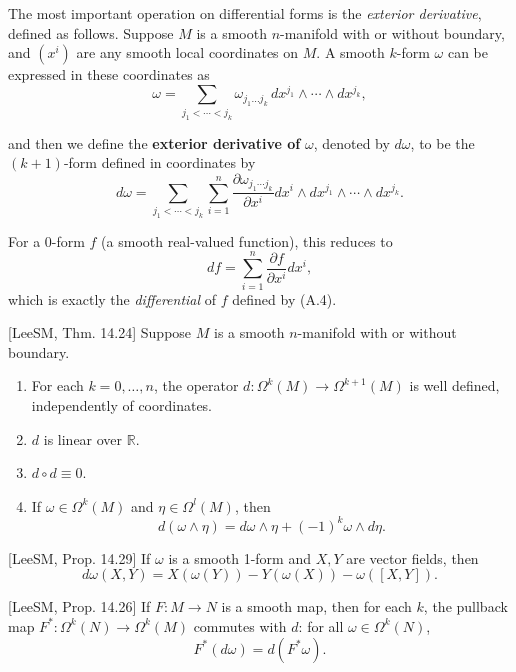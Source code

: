 The most important operation on differential forms is the \emph{exterior derivative}, defined as follows. Suppose $M$ is a smooth $n$-manifold with or without boundary, and $(x^i)$ are any smooth local coordinates on $M$. A smooth $k$-form $\omega$ can be expressed in these coordinates as
\[
\omega = \sum_{j_1 < \cdots < j_k} \omega_{j_1\ldots j_k} \, dx^{j_1} \wedge \cdots \wedge dx^{j_k},
\]

and then we define the \textbf{exterior derivative of} $\omega$, denoted by $d\omega$, to be the $(k+1)$-form defined in coordinates by
\[
d\omega = \sum_{j_1 < \cdots < j_k} \sum_{i=1}^n \frac{\partial \omega_{j_1 \cdots j_k}}{\partial x^i} dx^i \wedge dx^{j_1} \wedge \cdots \wedge dx^{j_k}.
\]

For a 0-form $f$ (a smooth real-valued function), this reduces to
\[
df = \sum_{i=1}^n \frac{\partial f}{\partial x^i} dx^i,
\]
which is exactly the \emph{differential} of $f$ defined by (A.4).

\begin{proposition}
\label{prop:exterior-differentiation-properties}
[LeeSM, Thm. 14.24] Suppose $M$ is a smooth $n$-manifold with or without boundary.
\begin{enumerate}
\item[(a)] For each $k = 0, \ldots, n$, the operator $d: \Omega^k(M) \to \Omega^{k+1}(M)$ is well defined, independently of coordinates.
\item[(b)] $d$ is linear over $\mathbb{R}$.
\item[(c)] $d \circ d \equiv 0$.
\item[(d)] If $\omega \in \Omega^k(M)$ and $\eta \in \Omega^l(M)$, then
\[
d(\omega \wedge \eta) = d\omega \wedge \eta + (-1)^k \omega \wedge d\eta.
\]
\end{enumerate}
\end{proposition}

\begin{proposition}
\label{prop:exterior-derivative-one-form}
[LeeSM, Prop. 14.29] If $\omega$ is a smooth 1-form and $X, Y$ are vector fields, then
\[
d\omega(X,Y) = X(\omega(Y)) - Y(\omega(X)) - \omega([X,Y]).
\]
\end{proposition}

\begin{proposition}
\label{prop:exterior-derivative-naturality}
[LeeSM, Prop. 14.26] If $F: M \to N$ is a smooth map, then for each $k$, the pullback map $F^*: \Omega^k(N) \to \Omega^k(M)$ commutes with $d$: for all $\omega \in \Omega^k(N)$,
\begin{equation}
F^*(d\omega) = d(F^*\omega). \tag{B.12}
\end{equation}
\end{proposition}


